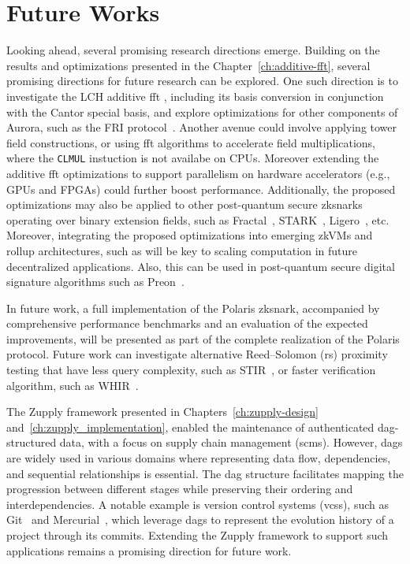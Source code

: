 \section{Future Works}

Looking ahead, several promising research directions emerge.  Building on the results and optimizations presented in the Chapter~\ref{ch:additive-fft}, several promising directions for future research can be explored. One such direction is to investigate the LCH additive \gls{fft} \cite{LCH-FFT2016}, including its basis conversion in conjunction with the Cantor special basis, and explore optimizations for other components of Aurora, such as the FRI protocol~\cite{FRI2018}. Another avenue could involve applying tower field constructions, or using  \gls{fft} algorithms to accelerate field multiplications, where the \texttt{CLMUL} instuction is not availabe on CPUs. Moreover extending the additive \gls{fft} optimizations to support parallelism on hardware accelerators (e.g., GPUs and FPGAs) could further boost performance. Additionally, the proposed optimizations may also be applied to other post-quantum secure \glspl{zksnark} operating over binary extension fields, such as Fractal~\cite{Chiesa2020Fractal}, STARK~\cite{Ben-Sasson2018STARK}, Ligero~\cite{Ames2017Ligero}, etc. Moreover, integrating the proposed optimizations into emerging zkVMs and rollup architectures, such as \cite{STARKnet, PolygonZKEVM, zkSync} will be key to scaling computation in future decentralized applications. Also, this can be used in post-quantum secure digital signature algorithms such as Preon~\cite{Preon2023}.

	
In future work, a full implementation of the Polaris \gls{zksnark}, accompanied by comprehensive performance benchmarks and an evaluation of the expected improvements, will be presented as part of the complete realization of the Polaris protocol. Future work can investigate alternative Reed–Solomon (\gls{rs}) proximity testing that have less query complexity, such as STIR~\cite{Arnon2024STIR}, or faster verification algorithm, such as WHIR~\cite{Arnon2024WHIR}.

The Zupply framework presented in Chapters~\ref{ch:zupply-design} and~\ref{ch:zupply_implementation}, enabled the maintenance of authenticated \gls{dag}-structured data, with a focus on supply chain management (\glspl{scm}). However, \glspl{dag} are widely used in various domains where representing data flow, dependencies, and sequential relationships is essential. The \gls{dag} structure facilitates mapping the progression between different stages while preserving their ordering and interdependencies. A notable example is version control systems (\glspl{vcs}), such as Git~\cite{gitonline2023} and Mercurial~\cite{mercurial}, which leverage \glspl{dag} to represent the evolution history of a project through its commits. Extending the Zupply framework to support such applications remains a promising direction for future work.
	
